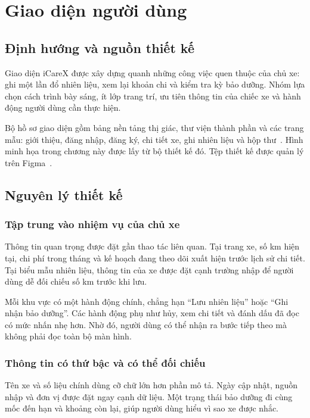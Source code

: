 \chapter{Giao diện người dùng}\label{chap:interface}
\newcommand{\dscolor}[1]{\fcolorbox{DSBorder}{#1}{\rule{0pt}{.8em}\hspace{1em}}}

\section{Định hướng và nguồn thiết kế}
Giao diện iCareX được xây dựng quanh những công việc quen thuộc của chủ xe: ghi một lần đổ nhiên liệu, xem lại khoản chi và kiểm tra kỳ bảo dưỡng. Nhóm lựa chọn cách trình bày sáng, ít lớp trang trí, ưu tiên thông tin của chiếc xe và hành động người dùng cần thực hiện.

Bộ hồ sơ giao diện gồm bảng nền tảng thị giác, thư viện thành phần và các trang mẫu: giới thiệu, đăng nhập, đăng ký, chi tiết xe, ghi nhiên liệu và hộp thư~\cite{designscreens}. Hình minh họa trong chương này được lấy từ bộ thiết kế đó. Tệp thiết kế được quản lý trên Figma~\cite{figma}.

\section{Nguyên lý thiết kế}
\subsection{Tập trung vào nhiệm vụ của chủ xe}
Thông tin quan trọng được đặt gần thao tác liên quan. Tại trang xe, số km hiện tại, chi phí trong tháng và kế hoạch đang theo dõi xuất hiện trước lịch sử chi tiết. Tại biểu mẫu nhiên liệu, thông tin của xe được đặt cạnh trường nhập để người dùng dễ đối chiếu số km trước khi lưu.

Mỗi khu vực có một hành động chính, chẳng hạn \enquote{Lưu nhiên liệu} hoặc \enquote{Ghi nhận bảo dưỡng}. Các hành động phụ như hủy, xem chi tiết và đánh dấu đã đọc có mức nhấn nhẹ hơn. Nhờ đó, người dùng có thể nhận ra bước tiếp theo mà không phải đọc toàn bộ màn hình.

\subsection{Thông tin có thứ bậc và có thể đối chiếu}
Tên xe và số liệu chính dùng cỡ chữ lớn hơn phần mô tả. Ngày cập nhật, nguồn nhập và đơn vị được đặt ngay cạnh dữ liệu. Một trạng thái bảo dưỡng đi cùng mốc đến hạn và khoảng còn lại, giúp người dùng hiểu vì sao xe được nhắc.

